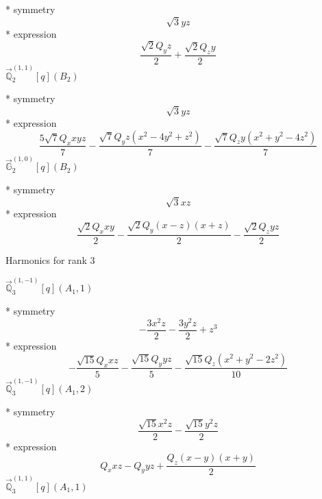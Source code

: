 \documentclass[fleqn,8pt]{jsarticle}
\begin{document}
\noindent\quad ** symmetry
\begin{dmath*}
\sqrt{3} y z
\end{dmath*}
\noindent\quad ** expression
\begin{dmath*}
\frac{\sqrt{2} Q_{y} z}{2} + \frac{\sqrt{2} Q_{z} y}{2}
\end{dmath*}
\noindent\quad $\vec{\mathbb{Q}}_{2}^{(1,1)}[q](B_{2})$

\noindent\quad ** symmetry
\begin{dmath*}
\sqrt{3} y z
\end{dmath*}
\noindent\quad ** expression
\begin{dmath*}
\frac{5 \sqrt{7} Q_{x} x y z}{7} - \frac{\sqrt{7} Q_{y} z \left(x^{2} - 4 y^{2} + z^{2}\right)}{7} - \frac{\sqrt{7} Q_{z} y \left(x^{2} + y^{2} - 4 z^{2}\right)}{7}
\end{dmath*}
\noindent\quad $\vec{\mathbb{G}}_{2}^{(1,0)}[q](B_{2})$

\noindent\quad ** symmetry
\begin{dmath*}
\sqrt{3} x z
\end{dmath*}
\noindent\quad ** expression
\begin{dmath*}
\frac{\sqrt{2} Q_{x} x y}{2} - \frac{\sqrt{2} Q_{y} \left(x - z\right) \left(x + z\right)}{2} - \frac{\sqrt{2} Q_{z} y z}{2}
\end{dmath*}

\noindent * Harmonics for rank 3

\noindent\quad $\vec{\mathbb{Q}}_{3}^{(1,-1)}[q](A_{1},1)$

\noindent\quad ** symmetry
\begin{dmath*}
- \frac{3 x^{2} z}{2} - \frac{3 y^{2} z}{2} + z^{3}
\end{dmath*}
\noindent\quad ** expression
\begin{dmath*}
- \frac{\sqrt{15} Q_{x} x z}{5} - \frac{\sqrt{15} Q_{y} y z}{5} - \frac{\sqrt{15} Q_{z} \left(x^{2} + y^{2} - 2 z^{2}\right)}{10}
\end{dmath*}
\noindent\quad $\vec{\mathbb{Q}}_{3}^{(1,-1)}[q](A_{1},2)$

\noindent\quad ** symmetry
\begin{dmath*}
\frac{\sqrt{15} x^{2} z}{2} - \frac{\sqrt{15} y^{2} z}{2}
\end{dmath*}
\noindent\quad ** expression
\begin{dmath*}
Q_{x} x z - Q_{y} y z + \frac{Q_{z} \left(x - y\right) \left(x + y\right)}{2}
\end{dmath*}
\noindent\quad $\vec{\mathbb{Q}}_{3}^{(1,1)}[q](A_{1},1)$
\end{document}
